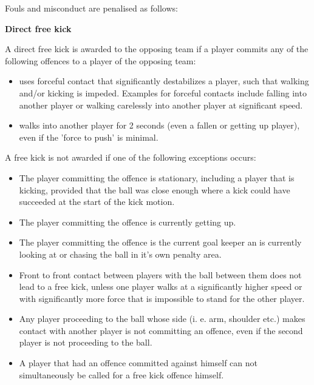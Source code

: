 \clearpage
\sffamily
{\bfseries\color[rgb]{0.4,0.4,0.4}{Law 12 -- Fouls and Misconduct} }
{}

\bigskip

Fouls and misconduct are penalised as follows:

\bigskip

{\color{magenta}
{\bfseries Direct free kick }

\headlinebox

A direct free kick is awarded to the opposing team if a player commits any of the following offences to a player of the opposing team:
\begin{itemize}
\item uses forceful contact that significantly destabilizes a player, such that walking and/or kicking is impeded. Examples for forceful contacts include falling into another player or walking carelessly into another player at significant speed.
\item walks into another player for 2 seconds (even a fallen or getting up player), even if the 'force to push' is minimal.
\end{itemize}

A free kick is not awarded if one of the following exceptions occurs: 
\begin{itemize}
\item The player committing the offence is stationary, including a player that is kicking, provided that the ball was close enough where a kick could have succeeded at the start of the kick motion.
\item The player committing the offence is currently getting up.
\item The player committing the offence is the current goal keeper an is currently looking at or chasing the ball in it's own penalty area.
\item Front to front contact between players with the ball between them does not lead to a free kick, unless one player walks at a significantly higher speed or with significantly more force that is impossible to stand for the other player.
\item Any player proceeding to the ball whose side (i. e. arm, shoulder etc.)  makes contact with another player is not committing an offence, even if the second player is not proceeding to the ball.
\item A player that had an offence committed against himself can not simultaneously be called for a free kick offence himself.
\end{itemize}}


